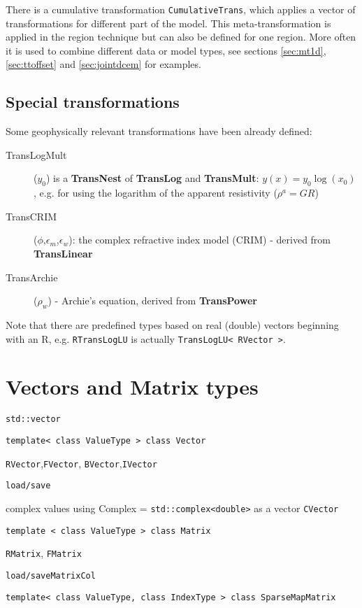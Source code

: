 There is a cumulative transformation \lstinline|CumulativeTrans|, which applies a vector of transformations for different part of the model.
This meta-transformation is applied in the region technique but can also be defined for one region.
More often it is used to combine different data or model types, see sections \ref{sec:mt1d}, \ref{sec:ttoffset} and \ref{sec:jointdcem} for examples.

\subsection*{Special transformations}
Some geophysically relevant transformations have been already defined:
\begin{description}
\item[TransLogMult]($y_0$) is a \textbf{TransNest} of \textbf{TransLog} and \textbf{TransMult}: $y(x)=y_0\log(x_0)$, e.g. for using the logarithm of the apparent resistivity ($\rho^a=G R$)
\item[TransCRIM]($\phi$,$\epsilon_m$,$\epsilon_w$): the complex refractive index model (CRIM) - derived from \textbf{TransLinear}
\item[TransArchie]($\rho_w$) - Archie's equation, derived from \textbf{TransPower}
\end{description}

Note that there are predefined types based on real (double) vectors beginning with an R, e.g. \lstinline|RTransLogLU| is actually \lstinline|TransLogLU< RVector >|.


\section{Vectors and Matrix types}\label{app:matrix}
\sperre

\lstinline|std::vector|

\lstinline|template< class ValueType > class Vector|

\lstinline|RVector|,\lstinline|FVector|, \lstinline|BVector|,\lstinline|IVector|

\lstinline|load/save|

complex values using Complex = \lstinline|std::complex<double>| as a vector \lstinline|CVector|

\lstinline|template < class ValueType > class Matrix|

\lstinline|RMatrix|, \lstinline|FMatrix|

\lstinline|load/saveMatrixCol|

\lstinline|template< class ValueType, class IndexType > class SparseMapMatrix|

